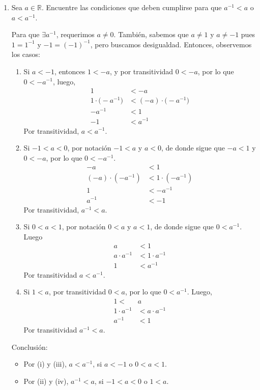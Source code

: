 \documentclass[11pt]{article}
\newcommand{\R}{\mathbb{R}}
\begin{document}
\begin{enumerate}[label=\alph*)]
\pagebreak

    \item Sea $a\in \R$. Encuentre las condiciones que deben cumplirse para que $a^{-1}<a$ o $a<a^{-1}$.
    
    Para que $\exists a^{-1}$, requerimos $a\neq 0$. También, sabemos que $a\neq 1$ y $a\neq -1$ pues $1=1^{-1}$ y $-1=(-1)^{-1}$, pero buscamos desigualdad. Entonces, observemos los casos: \begin{enumerate}[label=\roman*)]
        \item Si $a<-1$, entonces $1<-a$, y por transitividad $0<-a$, por lo que $0<-a^{-1}$, luego, \begin{align*}
            1 &< -a \\
            1\cdot \bigl(-a^{-1}\bigr) &< (-a) \cdot \bigl(-a^{-1}\bigr) \\
            -a^{-1} &< 1\\
            -1 &< a^{-1}
        \end{align*} Por transitividad, $a < a^{-1}$.
        \item Si $-1<a<0$, por notación $-1<a$ y $a<0$, de donde sigue que $-a<1$ y $0<-a$, por lo que $0<-a^{-1}$. \begin{align*}
            -a &< 1 \\
            (-a) \cdot (-a^{-1}) &< 1\cdot (-a^{-1})\\
            1 &< -a^{-1}\\
            a^{-1} &< -1
        \end{align*} Por transitividad, $a^{-1}<a$.
        \item Si $0<a<1$, por notación $0<a$ y $a<1$, de donde sigue que $0<a^{-1}$. Luego \begin{align*}
            a &< 1 \\
            a\cdot a^{-1} &< 1 \cdot a^{-1}\\
            1 &< a^{-1}
        \end{align*} Por transitividad $a<a^{-1}$.
        \item Si $1<a$, por transitividad $0<a$, por lo que $0<a^{-1}$. Luego, \begin{align*}
            1 <& a\\
            1 \cdot a^{-1} &< a \cdot a^{-1}\\
            a^{-1} &< 1
        \end{align*} Por transitividad $a^{-1}<a$.
    \end{enumerate}
    Conclusión: \begin{itemize}
        \item Por (i) y (iii), $a<a^{-1}$, si $a<-1$ o $0<a<1$.
        \item Por (ii) y (iv), $a^{-1}<a$, si $-1<a<0$ o $1<a$.
    \end{itemize}


\end{enumerate}
\end{document}
